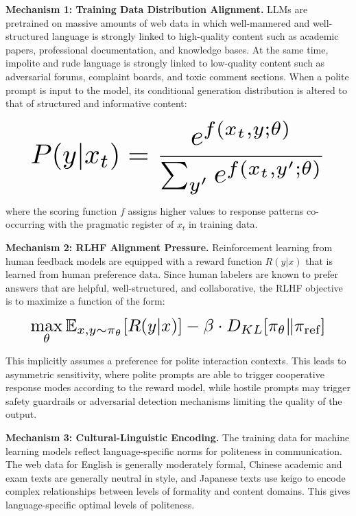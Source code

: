 \documentclass[conference]{IEEEtran}
\begin{document}
\textbf{Mechanism 1: Training Data Distribution Alignment.} LLMs are pretrained on massive amounts of web data in which well-mannered and well-structured language is strongly linked to high-quality content such as academic papers, professional documentation, and knowledge bases. At the same time, impolite and rude language is strongly linked to low-quality content such as adversarial forums, complaint boards, and toxic comment sections. When a polite prompt is input to the model, its conditional generation distribution is altered to that of structured and informative content:

\begin{equation}
\resizebox{0.89\columnwidth}{!}{$\displaystyle P(y|x_t) = \frac{e^{f(x_t, y; \theta)}}{\sum_{y'} e^{f(x_t, y'; \theta)}}$}
\end{equation}

where the scoring function $f$ assigns higher values to response patterns co-occurring with the pragmatic register of $x_t$ in training data.

\textbf{Mechanism 2: RLHF Alignment Pressure.} Reinforcement learning from human feedback models are equipped with a reward function $R(y | x)$ that is learned from human preference data. Since human labelers are known to prefer answers that are helpful, well-structured, and collaborative, the RLHF objective is to maximize a function of the form:

\begin{equation}
\resizebox{0.89\columnwidth}{!}{$\displaystyle \max_{\theta} \mathbb{E}_{x, y \sim \pi_\theta} [R(y|x)] - \beta \cdot D_{KL}[\pi_\theta \| \pi_{\text{ref}}]$}
\end{equation}

This implicitly assumes a preference for polite interaction contexts. This leads to asymmetric sensitivity, where polite prompts are able to trigger cooperative response modes according to the reward model, while hostile prompts may trigger safety guardrails or adversarial detection mechanisms limiting the quality of the output.

\textbf{Mechanism 3: Cultural-Linguistic Encoding.} The training data for machine learning models reflect language-specific norms for politeness in communication. The web data for English is generally moderately formal, Chinese academic and exam texts are generally neutral in style, and Japanese texts use keigo to encode complex relationships between levels of formality and content domains. This gives language-specific optimal levels of politeness.
\end{document}
